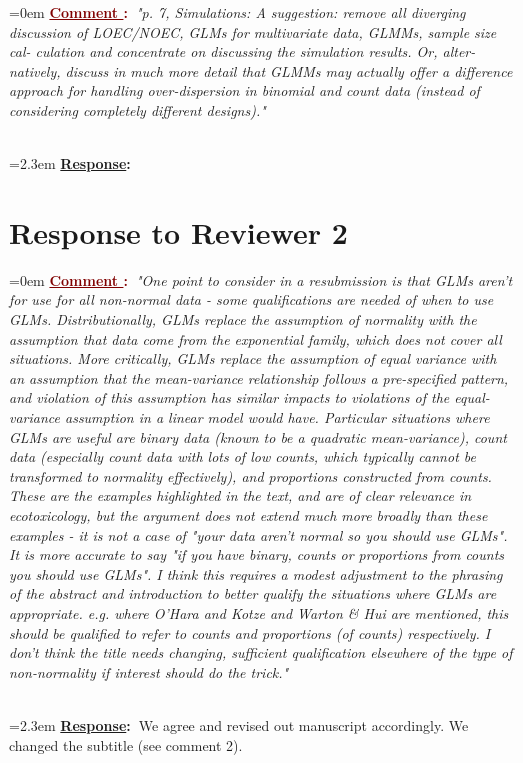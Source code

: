 \documentclass[12pt]{article}
\newcounter{cN}
\newcommand{\comment}[1]{
	\vspace{2em} 
	\refstepcounter{cN} %
	\noindent \hangindent=0em \textbf{\textcolor{Maroon}{\uline{Comment \thecN}:~}}\emph{"#1"}
	}
\newcommand{\response}[1]{
	\\[0.25em] 
	\hangindent=2.3em \textbf{\textcolor{NavyBlue}{\uline{Response}:~}}#1 
	}
\begin{document}
\comment{p. 7, Simulations: A suggestion: remove all diverging discussion of
LOEC/NOEC, GLMs for multivariate data, GLMMs, sample size cal-
culation and concentrate on discussing the simulation results. Or, alter-
natively, discuss in much more detail that GLMMs may actually offer a
difference approach for handling over-dispersion in binomial and count
data (instead of considering completely different designs).}
\response{}




\section{Response to Reviewer 2}
\vspace{-2em}

\comment{One point to consider in a resubmission is that GLMs aren't for use for all non-normal data - some qualifications are needed of when to use GLMs.  Distributionally, GLMs replace the assumption of normality with the assumption that data come from the exponential family, which does not cover all situations.  More critically, GLMs replace the assumption of equal variance with an assumption that the mean-variance relationship follows a pre-specified pattern, and violation of this assumption has similar impacts to violations of the equal-variance assumption in a linear model would have.  Particular situations where GLMs are useful are binary data (known to be a quadratic mean-variance), count data (especially count data with lots of low counts, which typically cannot be transformed to normality effectively), and proportions constructed from counts.  These are the examples highlighted in the text, and are of clear relevance in ecotoxicology, but the argument does not extend much
more broadly than these examples - it is not a case of "your data aren't normal so you should use GLMs".  It is more accurate to say "if you have binary, counts or proportions from counts you should use GLMs".  I think this requires a modest adjustment to the phrasing of the abstract and introduction to better qualify the situations where GLMs are appropriate.  e.g. where O'Hara and Kotze and Warton \& Hui are mentioned, this should be qualified to refer to counts and proportions (of counts) respectively.  I  don't think the title needs changing, sufficient qualification elsewhere of the type of non-normality if interest should do the trick.}
\response{We agree and revised out manuscript accordingly. We changed the subtitle (see comment 2). \todo{abstract, text}}
\end{document}
